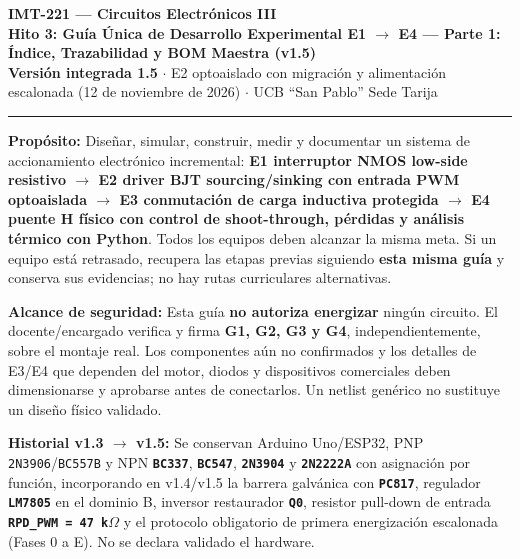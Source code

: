 \documentclass[10pt, a4paper, landscape]{article}
\begin{document}
\noindent
{\LARGE \textbf{\textcolor{ucbblue}{IMT-221 — Circuitos Electrónicos III}}}\\[0.12cm]
{\Large \textbf{Hito 3: Guía Única de Desarrollo Experimental E1 $\rightarrow$ E4 — Parte 1: Índice, Trazabilidad y BOM Maestra (v1.5)}}\\[0.08cm]
{\small \textbf{Versión integrada 1.5} $\cdot$ E2 optoaislado con migración y alimentación escalonada (12 de noviembre de 2026) $\cdot$ UCB ``San Pablo'' Sede Tarija}
\par\vspace{0.15cm}\noindent\rule{\linewidth}{0.4pt}\vspace{0.2cm}

\noindent
\textbf{Propósito:} Diseñar, simular, construir, medir y documentar un sistema de accionamiento electrónico incremental: \textbf{E1 interruptor NMOS low-side resistivo $\rightarrow$ E2 driver BJT sourcing/sinking con entrada PWM optoaislada $\rightarrow$ E3 conmutación de carga inductiva protegida $\rightarrow$ E4 puente H físico con control de shoot-through, pérdidas y análisis térmico con Python}. Todos los equipos deben alcanzar la misma meta. Si un equipo está retrasado, recupera las etapas previas siguiendo \textbf{esta misma guía} y conserva sus evidencias; no hay rutas curriculares alternativas.

\vspace{0.1cm}
\noindent
\textbf{\textcolor{warnred}{Alcance de seguridad:}} Esta guía \textbf{no autoriza energizar} ningún circuito. El docente/encargado verifica y firma \textbf{G1, G2, G3 y G4}, independientemente, sobre el montaje real. Los componentes aún no confirmados y los detalles de E3/E4 que dependen del motor, diodos y dispositivos comerciales deben dimensionarse y aprobarse antes de conectarlos. Un netlist genérico no sustituye un diseño físico validado.

\vspace{0.1cm}
\noindent
\textbf{Historial v1.3 $\rightarrow$ v1.5:} Se conservan Arduino Uno/ESP32, PNP \texttt{2N3906}/\texttt{BC557B} y NPN \textbf{\texttt{BC337}}, \textbf{\texttt{BC547}}, \textbf{\texttt{2N3904}} y \textbf{\texttt{2N2222A}} con asignación por función, incorporando en v1.4/v1.5 la barrera galvánica con \textbf{\texttt{PC817}}, regulador \textbf{\texttt{LM7805}} en el dominio B, inversor restaurador \textbf{\texttt{Q0}}, resistor pull-down de entrada \textbf{\texttt{RPD\_PWM = 47 k$\Omega$}} y el protocolo obligatorio de primera energización escalonada (Fases 0 a E). No se declara validado el hardware.
\end{document}
